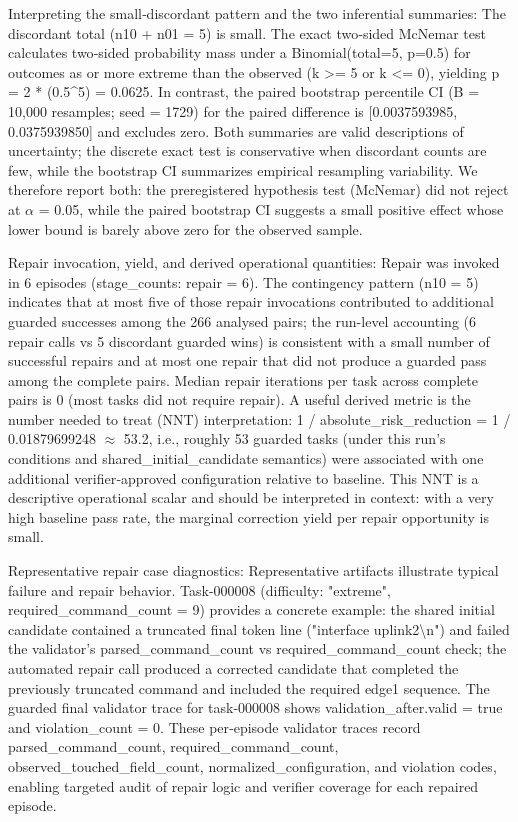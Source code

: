 \documentclass[conference]{IEEEtran}
\begin{document}
Interpreting the small‑discordant pattern and the two inferential summaries: The discordant total (n10 + n01 = 5) is small. The exact two‑sided McNemar test calculates two‑sided probability mass under a Binomial(total=5, p=0.5) for outcomes as or more extreme than the observed (k >= 5 or k <= 0), yielding p = 2 * (0.5\textasciicircum{}5) = 0.0625. In contrast, the paired bootstrap percentile CI (B = 10,000 resamples; seed = 1729) for the paired difference is [0.0037593985, 0.0375939850] and excludes zero. Both summaries are valid descriptions of uncertainty; the discrete exact test is conservative when discordant counts are few, while the bootstrap CI summarizes empirical resampling variability. We therefore report both: the preregistered hypothesis test (McNemar) did not reject at \ensuremath{\alpha} = 0.05, while the paired bootstrap CI suggests a small positive effect whose lower bound is barely above zero for the observed sample.

Repair invocation, yield, and derived operational quantities: Repair was invoked in 6 episodes (stage\_counts: repair = 6). The contingency pattern (n10 = 5) indicates that at most five of those repair invocations contributed to additional guarded successes among the 266 analysed pairs; the run-level accounting (6 repair calls vs 5 discordant guarded wins) is consistent with a small number of successful repairs and at most one repair that did not produce a guarded pass among the complete pairs. Median repair iterations per task across complete pairs is 0 (most tasks did not require repair). A useful derived metric is the number needed to treat (NNT) interpretation: 1 / absolute\_risk\_reduction = 1 / 0.01879699248 \ensuremath{\approx} 53.2, i.e., roughly 53 guarded tasks (under this run's conditions and shared\_initial\_candidate semantics) were associated with one additional verifier‑approved configuration relative to baseline. This NNT is a descriptive operational scalar and should be interpreted in context: with a very high baseline pass rate, the marginal correction yield per repair opportunity is small.

Representative repair case diagnostics: Representative artifacts illustrate typical failure and repair behavior. Task-000008 (difficulty: "extreme", required\_command\_count = 9) provides a concrete example: the shared initial candidate contained a truncated final token line ("interface uplink2\textbackslash{}n") and failed the validator's parsed\_command\_count vs required\_command\_count check; the automated repair call produced a corrected candidate that completed the previously truncated command and included the required edge1 sequence. The guarded final validator trace for task-000008 shows validation\_after.valid = true and violation\_count = 0. These per‑episode validator traces record parsed\_command\_count, required\_command\_count, observed\_touched\_field\_count, normalized\_configuration, and violation codes, enabling targeted audit of repair logic and verifier coverage for each repaired episode.
\end{document}
